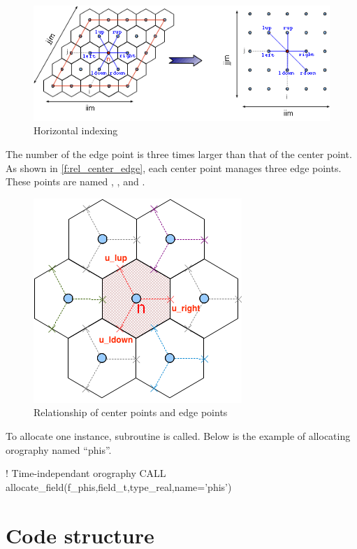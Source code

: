 \begin{figure}[htpb]
\centering
\includegraphics[scale=0.7]{figs/AIMES_DYNAMICO-30-0.png}
\caption{Horizontal indexing}\label{f:aimes_dynamico-30-0}
\end{figure}

The number of the edge point is three times larger than that of the center point.
As shown in \autoref{f:rel_center_edge}, each center point manages three edge points.
These points are named , , and .

\begin{figure}[htpb]
\centering
\includegraphics[scale=0.5]{figs/AIMES_DYNAMICO-30-1.png}
\caption{Relationship of center points and edge points}\label{f:rel_center_edge}
\end{figure}

To allocate one  instance, subroutine 
is called.
%
Below is the example of allocating orography named ``phis''.

\begin{LstF90}
 ! Time-independant orography
    CALL allocate_field(f_phis,field_t,type_real,name='phis')
\end{LstF90}



\section{Code structure}

